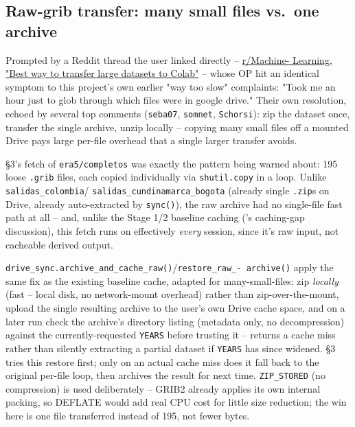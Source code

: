 \documentclass[11pt]{article}
\begin{document}
\subsection{Raw-grib transfer: many small files vs.\ one archive}
\label{sec:raw-archive-cache}

Prompted by a Reddit thread the user linked directly --
\href{https://www.reddit.com/r/MachineLearning/comments/sxui5r/}{r/Machine-
Learning, "Best way to transfer large datasets to Colab"} -- whose OP hit
an identical symptom to this project's own earlier "way too slow"
complaints: "Took me an hour just to glob through which files were in
google drive." Their own resolution, echoed by several top comments
(\texttt{seba07}, \texttt{somnet}, \texttt{Schorsi}): zip the dataset
once, transfer the single archive, unzip locally -- copying many small
files off a mounted Drive pays large per-file overhead that a single
larger transfer avoids.

\S3's fetch of \texttt{era5/completos} was exactly the pattern being
warned about: 195 loose \texttt{.grib} files, each copied individually
via \texttt{shutil.copy} in a loop. Unlike \texttt{salidas\_colombia}/
\texttt{salidas\_cundinamarca\_bogota} (already single \texttt{.zip}s on
Drive, already auto-extracted by \texttt{sync()}), the raw archive had no
single-file fast path at all -- and, unlike the Stage 1/2 baseline
caching ('s caching-gap discussion), this
fetch runs on effectively \emph{every} session, since it's raw input, not
cacheable derived output.

\texttt{drive\_sync.archive\_and\_cache\_raw()}/\texttt{restore\_raw\_-
archive()} apply the same fix as the existing baseline cache, adapted for
many-small-files: zip \emph{locally} (fast -- local disk, no
network-mount overhead) rather than zip-over-the-mount, upload the single
resulting archive to the user's own Drive cache space, and on a later run
check the archive's directory listing (metadata only, no decompression)
against the currently-requested \texttt{YEARS} before trusting it --
returns a cache miss rather than silently extracting a partial dataset if
\texttt{YEARS} has since widened. \S3 tries this restore first; only on
an actual cache miss does it fall back to the original per-file loop,
then archives the result for next time. \texttt{ZIP\_STORED} (no
compression) is used deliberately -- GRIB2 already applies its own
internal packing, so DEFLATE would add real CPU cost for little size
reduction; the win here is one file transferred instead of 195, not fewer
bytes.
\end{document}
